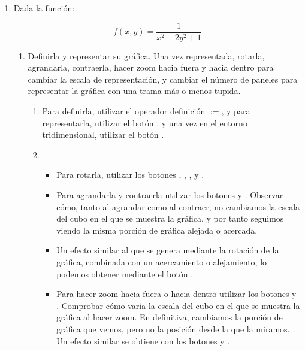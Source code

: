 \begin{enumerate}[leftmargin=*]
\item Dada la función:

\[
f(x,y) = \frac{1} {{x^2  + 2y^2  + 1}}
\]

\begin{enumerate}
  \item Definirla y representar su gráfica. Una vez representada,
  rotarla, agrandarla, contraerla, hacer zoom hacia fuera y hacia
  dentro para cambiar la escala de representación, y cambiar el
  número de paneles para representar la gráfica con una trama más
  o menos tupida.

\begin{indication}
{

\begin{enumerate}

\item Para definirla, utilizar el operador definición $:=$, y para
representarla, utilizar el botón , y una vez en el
entorno tridimensional, utilizar el botón .

\item

\begin{itemize}

\item Para rotarla, utilizar los botones ,
, ,
 y .

\item Para agrandarla y contraerla utilizar los botones
 y . Observar cómo, tanto al
agrandar como al contraer, no cambiamos la escala del cubo en el que
se muestra la gráfica, y por tanto seguimos viendo la misma porción
de gráfica alejada o acercada.

\item Un efecto similar al que se genera mediante la rotación de
la gráfica, combinada con un acercamiento o alejamiento, lo podemos
obtener mediante el botón .

\item Para hacer zoom hacia fuera o hacia dentro utilizar los
botones  y .
Comprobar cómo varía la escala del cubo en el que se muestra la
gráfica al hacer zoom. En definitiva, cambiamos la porción de
gráfica que vemos, pero no la posición desde la que la miramos. Un
efecto similar se obtiene con los botones  y .


\end{itemize}
\end{enumerate}}
\end{indication}
\end{enumerate}
\end{enumerate}
